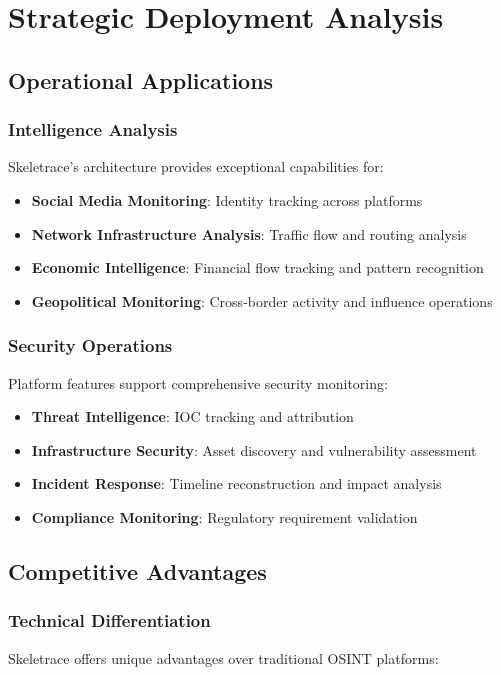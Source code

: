 \documentclass[12pt,a4paper]{article}
\begin{document}
\section{Strategic Deployment Analysis}

\subsection{Operational Applications}

\subsubsection{Intelligence Analysis}
Skeletrace's architecture provides exceptional capabilities for:

\begin{itemize}
\item \textbf{Social Media Monitoring}: Identity tracking across platforms
\item \textbf{Network Infrastructure Analysis}: Traffic flow and routing analysis
\item \textbf{Economic Intelligence}: Financial flow tracking and pattern recognition
\item \textbf{Geopolitical Monitoring}: Cross-border activity and influence operations
\end{itemize}

\subsubsection{Security Operations}
Platform features support comprehensive security monitoring:

\begin{itemize}
\item \textbf{Threat Intelligence}: IOC tracking and attribution
\item \textbf{Infrastructure Security}: Asset discovery and vulnerability assessment
\item \textbf{Incident Response}: Timeline reconstruction and impact analysis
\item \textbf{Compliance Monitoring}: Regulatory requirement validation
\end{itemize}

\subsection{Competitive Advantages}

\subsubsection{Technical Differentiation}
Skeletrace offers unique advantages over traditional OSINT platforms:
\end{document}

